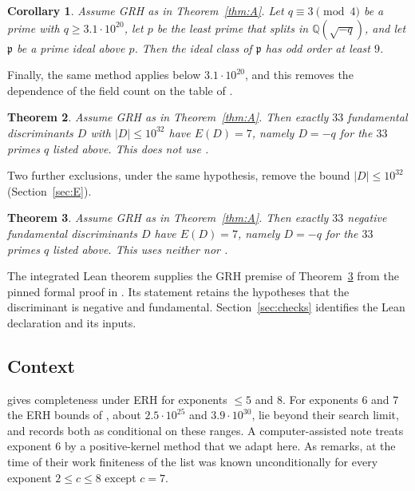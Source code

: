 \documentclass[11pt]{amsart}
\newtheorem{theorem}{Theorem}
\newtheorem{corollary}[theorem]{Corollary}
\theoremstyle{remark}
\newcommand{\Q}{\mathbb{Q}}
\newcommand{\p}{\mathfrak{p}}
\begin{document}
\begin{corollary}\label{cor:C}
Assume GRH as in Theorem~\ref{thm:A}. Let $q\equiv3\pmod4$ be a prime with $q\ge3.1\cdot10^{20}$, let $p$ be the least prime that splits in $\Q(\sqrt{-q})$, and let $\p$ be a prime ideal above $p$. Then the ideal class of $\p$ has odd order at least $9$.
\end{corollary}

Finally, the same method applies below $3.1\cdot10^{20}$, and this removes the dependence of the field count on the table of \cite{EKN}.

\begin{theorem}\label{thm:D}
Assume GRH as in Theorem~\ref{thm:A}. Then exactly $33$ fundamental discriminants $D$ with $|D|\le10^{32}$ have $E(D)=7$, namely $D=-q$ for the $33$ primes $q$ listed above. This does not use \cite[Theorem~1]{EKN}.
\end{theorem}

Two further exclusions, under the same hypothesis, remove the bound $|D|\le10^{32}$ (Section~\ref{sec:E}).

\begin{theorem}\label{thm:E}
Assume GRH as in Theorem~\ref{thm:A}. Then exactly $33$ negative fundamental discriminants $D$ have $E(D)=7$, namely $D=-q$ for the $33$ primes $q$ listed above. This uses neither \cite[Theorem~1]{EKN} nor \cite[Theorem~3]{EKN}.
\end{theorem}

The integrated Lean theorem supplies the GRH premise of Theorem~\ref{thm:E} from the pinned formal proof in \cite{GRH}. Its statement retains the hypotheses that the discriminant is negative and fundamental. Section~\ref{sec:checks} identifies the Lean declaration and its inputs.

\subsection*{Context}
\cite[Theorem~2]{EKN} gives completeness under ERH for exponents $\le5$ and $8$. For exponents $6$ and $7$ the ERH bounds of \cite[Table~2]{EKN}, about $2.5\cdot10^{25}$ and $3.9\cdot10^{30}$, lie beyond their search limit, and \cite[Theorem~1.3(5),(6)]{ARSX} records both as conditional on these ranges. A computer-assisted note \cite{E6} treats exponent $6$ by a positive-kernel method that we adapt here. As \cite{EKN} remarks, at the time of their work finiteness of the list was known unconditionally for every exponent $2\le c\le 8$ except $c=7$.
\end{document}
